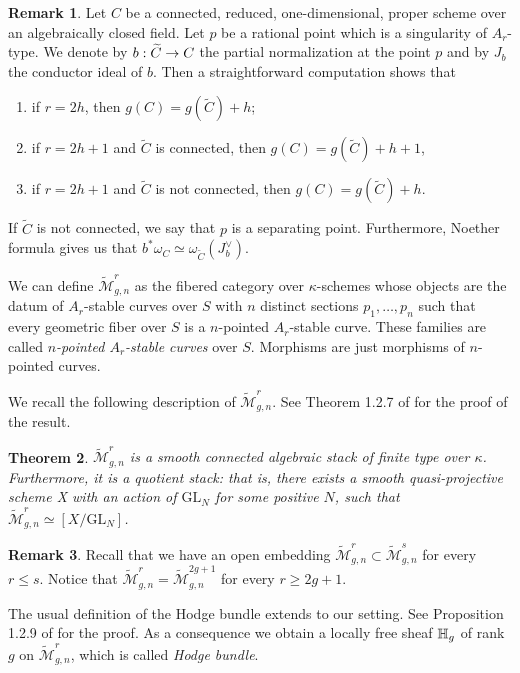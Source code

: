 \documentclass{alggeom}
\numberwithin{equation}{section}
\numberwithin{subsection}{section}
\newtheorem{theorem}{Theorem}[section]
\theoremstyle{definition}
\newtheorem{remark}[theorem]{Remark}
\theoremstyle{remark}
\newcommand\arr{\ifinner\to\else\longrightarrow\fi}
\newcommand{\GL}{\mathrm{GL}}
\newcommand{\Mtilde}{\widetilde{\mathcal M}}
\newcommand{\mt}{\widetilde{\mathcal M}}
\begin{document}
\begin{remark}\label{rem:genus-count}
	Let $C$ be a connected, reduced, one-dimensional, proper scheme over an algebraically closed field. Let $p$ be a rational point which is a singularity of $A_r$-type. We denote by $b:\widetilde{C}\arr C$ the partial normalization at the point $p$ and by $J_b$ the conductor ideal of $b$. Then a straightforward computation shows that \begin{enumerate}
		\item if $r=2h$, then $g(C)=g(\widetilde{C})+h$;
		\item if $r=2h+1$ and $\widetilde{C}$ is connected, then $g(C)=g(\widetilde{C})+h+1$,
		\item if $r=2h+1$ and $\widetilde{C}$ is not connected, then $g(C)=g(\widetilde{C})+h$.
	\end{enumerate}
	If $\widetilde{C}$ is not connected, we say that $p$ is a separating point. Furthermore, Noether formula gives us that $b^*\omega_C \simeq \omega_{\widetilde{C}}(J_b^{\vee})$.
\end{remark}


 We can define $\Mtilde_{g,n}^r$ as the fibered category over $\kappa$-schemes  whose objects are the datum of $A_r$-stable curves over $S$ with $n$ distinct sections $p_1,\dots,p_n$ such that every geometric fiber over $S$ is a  $n$-pointed $A_r$-stable curve. These families are called \emph{$n$-pointed $A_r$-stable curves} over $S$. Morphisms are just morphisms of $n$-pointed curves.

We recall the following description of $\Mtilde_{g,n}^r$. See Theorem 1.2.7 of \cite{PerTesi} for the proof of the result. 

\begin{theorem}\label{theo:descr-quot}
	$\Mtilde_{g,n}^r$ is a smooth connected algebraic stack of finite type over $\kappa$. Furthermore, it is a quotient stack: that is, there exists a smooth quasi-projective scheme X with an action of $\GL_N$ for some positive $N$, such that 
	$ \Mtilde_{g,n}^r \simeq [X/\GL_N]$.
\end{theorem}


\begin{remark}\label{rem: max-sing}
Recall that we have an open embedding $\Mtilde_{g,n}^r  \subset \Mtilde_{g,n}^s$ for every $r\leq s$. Notice that $\Mtilde_{g,n}^r=\Mtilde_{g,n}^{2g+1}$ for every $r\geq 2g+1$. 
\end{remark}

The usual definition of the Hodge bundle extends to our setting. See Proposition 1.2.9 of \cite{PerTesi} for the proof.  As a consequence we obtain a locally free sheaf $\mathbb{H}_{g}$ of rank~$g$ on $\mt_{g, n}^r$, which is called \emph{Hodge bundle}. 
\end{document}
